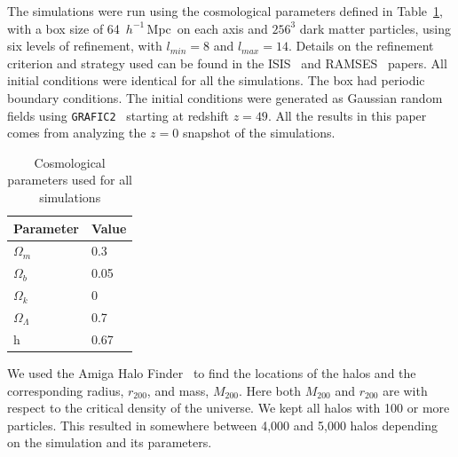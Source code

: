 \documentclass{aa}
\newcommand{\hmpc}{\,$h^{-1}$\,Mpc}
\begin{document}
The simulations were run using the cosmological parameters defined in Table~\ref{tab:cosmo_params}, with a box size of 64 \hmpc\ on each axis and $256^3$ dark matter particles, using six levels of refinement, with $l_{min}=8$ and $l_{max}=14$. Details on the refinement criterion and strategy used can be found in  the ISIS~\citep{llinares2014isis} and RAMSES~\citep{teyssier2002cosmological} papers.
All initial conditions were  identical for all the simulations. The box had periodic boundary conditions. The initial conditions were generated as Gaussian random fields using \texttt{GRAFIC2}~\citep{bertschinger2001multiscale,prunet2008initial} starting at  redshift $z = 49$. All the results in this paper comes from analyzing the $z=0$ snapshot of the simulations.

\begin{table}
        \centering
    \caption{Cosmological parameters used for all simulations}
    \label{tab:cosmo_params}
        \begin{tabular}{l l}
    \hline
    Parameter & Value \\
    \hline
    $\Omega_m$ & 0.3\\
    $\Omega_b$ & 0.05 \\
    $\Omega_k$ & 0 \\ 
    $\Omega_\Lambda$ & 0.7 \\
    h & 0.67\\
    \hline
        \end{tabular}
\end{table}

We used the Amiga Halo Finder~\citep{gill2004evolution,knollmann2009ahf} to find the locations of the halos and the corresponding radius, $r_{200}$, and mass, $M_{200}$. Here both $M_{200}$ and $r_{200}$ are with respect to the critical density of the universe. We kept all halos with 100 or more particles. This resulted in somewhere between 4,000 and 5,000 halos depending on the simulation and its parameters.
\end{document}
